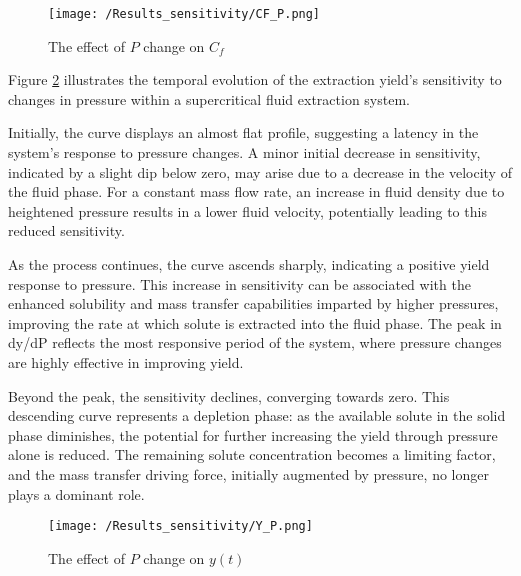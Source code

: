 \documentclass[../Article_Sensitivity_Analsysis.tex]{subfiles}
\begin{document}
	\begin{figure}[h!]
		\centering
		\texttt{[image: /Results\_sensitivity/CF\_P.png]}
		\caption{The effect of $P$ change on $C_f$}
		\label{fig:Sensitivty_P_CF}
	\end{figure}
	
	Figure \ref{fig:Sensitivty_P_y} illustrates the temporal evolution of the extraction yield's sensitivity to changes in pressure within a supercritical fluid extraction system. 
	
	Initially, the curve displays an almost flat profile, suggesting a latency in the system's response to pressure changes. A minor initial decrease in sensitivity, indicated by a slight dip below zero, may arise due to a decrease in the velocity of the fluid phase. For a constant mass flow rate, an increase in fluid density due to heightened pressure results in a lower fluid velocity, potentially leading to this reduced sensitivity.
	
	As the process continues, the curve ascends sharply, indicating a positive yield response to pressure. This increase in sensitivity can be associated with the enhanced solubility and mass transfer capabilities imparted by higher pressures, improving the rate at which solute is extracted into the fluid phase. The peak in dy/dP reflects the most responsive period of the system, where pressure changes are highly effective in improving yield.
	
	Beyond the peak, the sensitivity declines, converging towards zero. This descending curve represents a depletion phase: as the available solute in the solid phase diminishes, the potential for further increasing the yield through pressure alone is reduced. The remaining solute concentration becomes a limiting factor, and the mass transfer driving force, initially augmented by pressure, no longer plays a dominant role.
	
	\begin{figure}[h!]
		\centering
		\texttt{[image: /Results\_sensitivity/Y\_P.png]}
		\caption{The effect of $P$ change on $y(t)$}
		\label{fig:Sensitivty_P_y}
	\end{figure}
		
\end{document}
